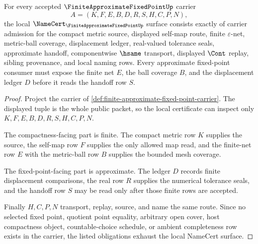\begin{theorem}
\label{thm:finite-approximate-fixed-point-namecert-obligations}
For every accepted $\FiniteApproximateFixedPointUp$ carrier
$$
A=(K,F,E,B,D,R,S,H,C,P,N),
$$
the local $\NameCert_{\FiniteApproximateFixedPointUp}$ surface consists exactly of carrier admission for the compact metric source, displayed self-map route, finite $\varepsilon$-net, metric-ball coverage, displacement ledger, real-valued tolerance seals, approximate handoff, componentwise $\hsame$ transport, displayed $\Cont$ replay, sibling provenance, and local naming rows. Every approximate fixed-point consumer must expose the finite net $E$, the ball coverage $B$, and the displacement ledger $D$ before it reads the handoff row $S$.
\end{theorem}
\begin{proof}
Project the carrier of \autoref{def:finite-approximate-fixed-point-carrier}. The displayed tuple is the whole public packet, so the local certificate can inspect only $K,F,E,B,D,R,S,H,C,P,N$.

The compactness-facing part is finite. The compact metric row $K$ supplies the source, the self-map row $F$ supplies the only allowed map read, and the finite-net row $E$ with the metric-ball row $B$ supplies the bounded mesh coverage.

The fixed-point-facing part is approximate. The ledger $D$ records finite displacement comparisons, the real row $R$ supplies the numerical tolerance seals, and the handoff row $S$ may be read only after those finite rows are accepted.

Finally $H,C,P,N$ transport, replay, source, and name the same route. Since no selected fixed point, quotient point equality, arbitrary open cover, host compactness object, countable-choice schedule, or ambient completeness row exists in the carrier, the listed obligations exhaust the local NameCert surface.
\end{proof}

